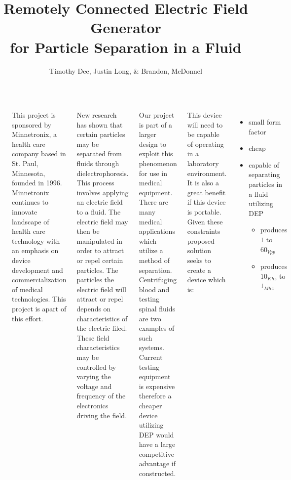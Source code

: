 \documentclass[25pt, a0paper, portrait, margin=0mm, innermargin=15mm, blockverticalspace=15mm, colspace=15mm, subcolspace=8mm]{tikzposter}
\author{Timothy Dee, Justin Long, \& Brandon, McDonnel}
\title{Remotely Connected Electric Field Generator \\
for Particle Separation in a Fluid}
\institute{Team May1612}
\begin{document}
\maketitle

\begin{columns}

{
\begin{tikzfigure}
\includegraphics[width=0.2\textwidth]{images/minnetronix_logo.png}
\end{tikzfigure} 

This project is sponsored by
Minnetronix, a health care company based in St. Paul, Minnesota,
founded in 1996.
Minnetronix continues to innovate landscape of health care technology
with an emphasis on device development and commercialization of medical technologies.
This project is apart of this effort.
}

%
%
{
New research has shown that certain particles may be separated from fluids through dielectrophoresis.
This process involves applying an electric field to a fluid.
The electric field may then be manipulated in order to attract or repel certain particles.
The particles the electric field will attract or repel depends on
characteristics of the electric filed.
These field characteristics may be controlled
by varying the voltage and frequency 
of the electronics driving the field.

Our project is part of a larger design to 
exploit this phenomenon for use in medical equipment.
There are many medical applications which
utilize a method of separation.
Centrifuging blood and
testing spinal fluids are two examples of 
such systems.
Current testing equipment is expensive therefore
a cheaper device utilizing DEP would have 
a large competitive advantage if constructed. 
}


{
This device will need to be capable of operating in a laboratory environment.
It is also a great benefit if this device is portable.
Given these constraints proposed solution seeks to create a device which is:
\begin{itemize}
\item small form factor
\item cheap
\item capable of separating particles in a fluid utilizing DEP
  \begin{itemize}
  \item produces $1$ to $60_{Vpp}$
  \item produces $10_{Khz}$ to $1_{Mhz}$
  \end{itemize}
\end{itemize}
}


\end{columns}
\end{document}

